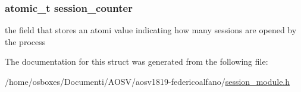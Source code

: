 \subsubsection[{\texorpdfstring{session\+\_\+counter}{session_counter}}]{\setlength{\rightskip}{0pt plus 5cm}atomic\+\_\+t session\+\_\+counter}\hypertarget{structsession__proc__node_a4044530856f9298fceb80cb98e0cc890}{}\label{structsession__proc__node_a4044530856f9298fceb80cb98e0cc890}
the field that stores an atomi value indicating how many sessions are opened by the process 

The documentation for this struct was generated from the following file\+:\begin{DoxyCompactItemize}
\item 
/home/osboxes/\+Documenti/\+A\+O\+S\+V/aosv1819-\/federicoalfano/\hyperlink{session__module_8h}{session\+\_\+module.\+h}\end{DoxyCompactItemize}
